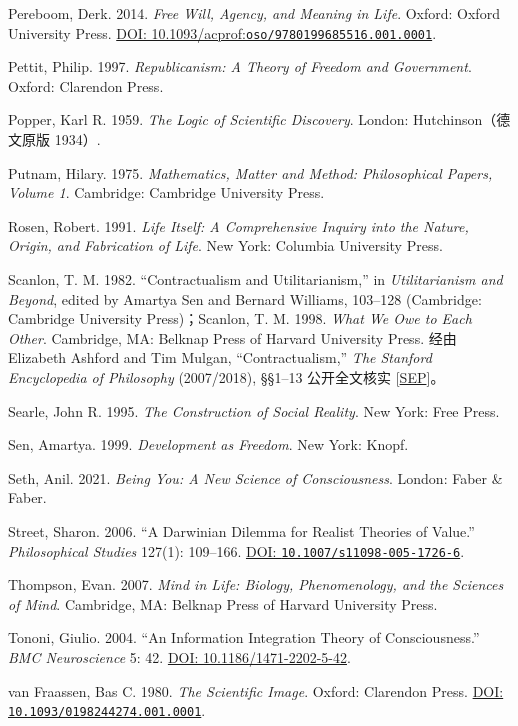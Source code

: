 \documentclass[
  11pt,
  oneside]{book}
\begin{document}
Pereboom, Derk. 2014. \emph{Free Will, Agency, and Meaning in Life}. Oxford: Oxford University Press. \href{https://doi.org/10.1093/acprof:oso/9780199685516.001.0001}{DOI: 10.1093/acprof:\nolinkurl{oso/9780199685516.001.0001}}.

Pettit, Philip. 1997. \emph{Republicanism: A Theory of Freedom and Government}. Oxford: Clarendon Press.

Popper, Karl R. 1959. \emph{The Logic of Scientific Discovery}. London: Hutchinson（德文原版 1934）.

Putnam, Hilary. 1975. \emph{Mathematics, Matter and Method: Philosophical Papers, Volume 1}. Cambridge: Cambridge University Press.

Rosen, Robert. 1991. \emph{Life Itself: A Comprehensive Inquiry into the Nature, Origin, and Fabrication of Life}. New York: Columbia University Press.

Scanlon, T. M. 1982. ``Contractualism and Utilitarianism,'' in \emph{Utilitarianism and Beyond}, edited by Amartya Sen and Bernard Williams, 103--128 (Cambridge: Cambridge University Press)；Scanlon, T. M. 1998. \emph{What We Owe to Each Other}. Cambridge, MA: Belknap Press of Harvard University Press. 经由 Elizabeth Ashford and Tim Mulgan, ``Contractualism,'' \emph{The Stanford Encyclopedia of Philosophy} (2007/2018), §§1--13 公开全文核实 {[}\href{https://plato.stanford.edu/entries/contractualism/}{SEP}{]}。

Searle, John R. 1995. \emph{The Construction of Social Reality}. New York: Free Press.

Sen, Amartya. 1999. \emph{Development as Freedom}. New York: Knopf.

Seth, Anil. 2021. \emph{Being You: A New Science of Consciousness}. London: Faber \& Faber.

Street, Sharon. 2006. ``A Darwinian Dilemma for Realist Theories of Value.'' \emph{Philosophical Studies} 127(1): 109--166. \href{https://doi.org/10.1007/s11098-005-1726-6}{DOI: \nolinkurl{10.1007/s11098-005-1726-6}}.

Thompson, Evan. 2007. \emph{Mind in Life: Biology, Phenomenology, and the Sciences of Mind}. Cambridge, MA: Belknap Press of Harvard University Press.

Tononi, Giulio. 2004. ``An Information Integration Theory of Consciousness.'' \emph{BMC Neuroscience} 5: 42. \href{https://doi.org/10.1186/1471-2202-5-42}{DOI: 10.1186/1471-2202-5-42}.

van Fraassen, Bas C. 1980. \emph{The Scientific Image}. Oxford: Clarendon Press. \href{https://doi.org/10.1093/0198244274.001.0001}{DOI: \nolinkurl{10.1093/0198244274.001.0001}}.
\end{document}
